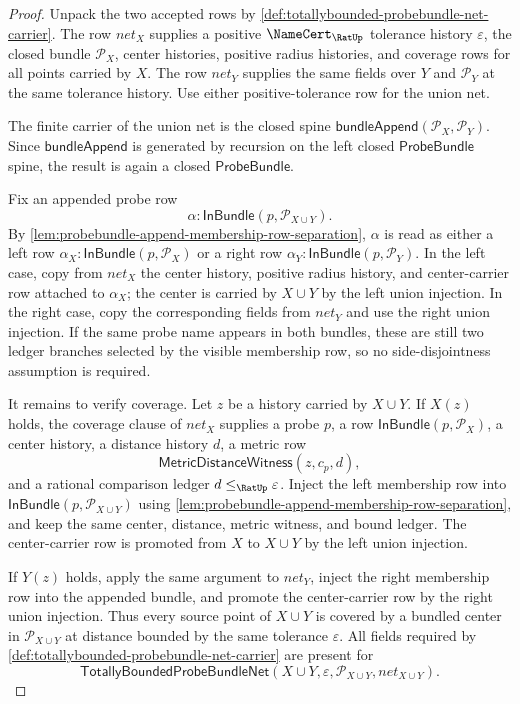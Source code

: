 \begin{proof}
Unpack the two accepted rows by \autoref{def:totallybounded-probebundle-net-carrier}. The row $net_X$ supplies a positive $\NameCert_{\RatUp}$ tolerance history $\varepsilon$, the closed bundle $\mathcal{P}_X$, center histories, positive radius histories, and coverage rows for all points carried by $X$. The row $net_Y$ supplies the same fields over $Y$ and $\mathcal{P}_Y$ at the same tolerance history. Use either positive-tolerance row for the union net.

The finite carrier of the union net is the closed spine $\mathsf{bundleAppend}(\mathcal{P}_X,\mathcal{P}_Y)$. Since $\mathsf{bundleAppend}$ is generated by recursion on the left closed $\mathsf{ProbeBundle}$ spine, the result is again a closed $\mathsf{ProbeBundle}$.

Fix an appended probe row
$$
\alpha:\mathsf{InBundle}(p,\mathcal{P}_{X\cup Y}).
$$
By \autoref{lem:probebundle-append-membership-row-separation}, $\alpha$ is read as either a left row $\alpha_X:\mathsf{InBundle}(p,\mathcal{P}_X)$ or a right row $\alpha_Y:\mathsf{InBundle}(p,\mathcal{P}_Y)$. In the left case, copy from $net_X$ the center history, positive radius history, and center-carrier row attached to $\alpha_X$; the center is carried by $X\cup Y$ by the left union injection. In the right case, copy the corresponding fields from $net_Y$ and use the right union injection. If the same probe name appears in both bundles, these are still two ledger branches selected by the visible membership row, so no side-disjointness assumption is required.

It remains to verify coverage. Let $z$ be a history carried by $X\cup Y$. If $X(z)$ holds, the coverage clause of $net_X$ supplies a probe $p$, a row $\mathsf{InBundle}(p,\mathcal{P}_X)$, a center history, a distance history $d$, a metric row
$$
\mathsf{MetricDistanceWitness}(z,c_p,d),
$$
and a rational comparison ledger $d\leq_{\RatUp}\varepsilon$. Inject the left membership row into $\mathsf{InBundle}(p,\mathcal{P}_{X\cup Y})$ using \autoref{lem:probebundle-append-membership-row-separation}, and keep the same center, distance, metric witness, and bound ledger. The center-carrier row is promoted from $X$ to $X\cup Y$ by the left union injection.

If $Y(z)$ holds, apply the same argument to $net_Y$, inject the right membership row into the appended bundle, and promote the center-carrier row by the right union injection. Thus every source point of $X\cup Y$ is covered by a bundled center in $\mathcal{P}_{X\cup Y}$ at distance bounded by the same tolerance $\varepsilon$. All fields required by \autoref{def:totallybounded-probebundle-net-carrier} are present for
$$
\mathsf{TotallyBoundedProbeBundleNet}(X\cup Y,\varepsilon,\mathcal{P}_{X\cup Y},net_{X\cup Y}).
$$
\end{proof}

